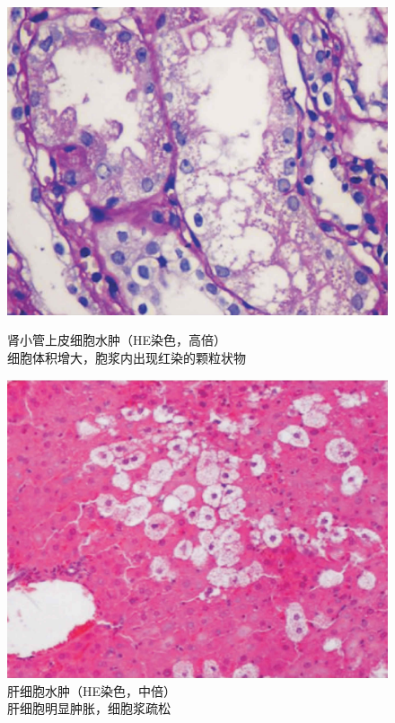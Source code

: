 \begin{figure}[!htbp]
    \centering
    \begin{minipage}[b]{0.45\textwidth} 
    \includegraphics{./images/Image00007.jpg}
	\caption{肾小管上皮细胞水肿（HE染色，高倍） \\ {\small 细胞体积增大，胞浆内出现红染的颗粒状物}}
    \label{fig1-6} 
    \end{minipage}
\hspace{0.04\textwidth}%
\begin{minipage}[b]{0.45\textwidth} 
    \includegraphics{./images/Image00008.jpg}
    \caption{肝细胞水肿（HE染色，中倍） \\ {\small 肝细胞明显肿胀，细胞浆疏松}}
    \label{fig1-7} 
\end{minipage}
\end{figure} 

